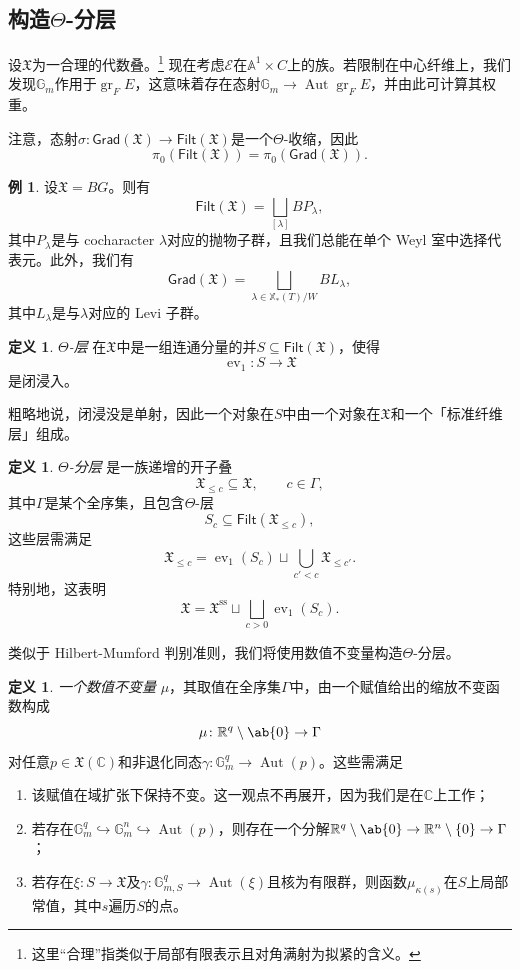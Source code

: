 \documentclass{amsart}
\theoremstyle{definition}
\newtheorem{defn}[thm]{定义}
\newtheorem{exm}[thm]{例}
\theoremstyle{remark}
\theoremstyle{plain}
\theoremstyle{definition}
\theoremstyle{remark}
\newcommand{\A}{\mathbb{A}}
\newcommand{\G}{\mathbb{G}}
\newcommand{\R}{\mathbb{R}}
\newcommand{\C}{\mathbb{C}}
\newcommand{\mc}[1]{\mathcal{#1}}
\newcommand{\mf}[1]{\mathfrak{#1}}
\newcommand{\mr}[1]{\mathrm{#1}}
\newcommand{\on}[1]{\operatorname{#1}}
\newcommand{\ms}[1]{\mathsf{#1}}
\newcommand{\1}{\mathbf{1}}
\newcommand{\2}{\mathbf{2}}
\newcommand{\3}{\mathbf{3}}
\DeclareMathOperator{\Aut}{Aut}
\DeclareMathOperator{\ev}{ev}
\begin{document}
\subsection{构造\(\Theta\)-分层}%
\label{sub:Construction of Theta-stratifications}

设\(\mf{X}\)为一合理的代数叠。\footnote{ 这里“合理”指类似于局部有限表示且对角满射为拟紧的含义。} 现在考虑\(\mc{E}\)在\(\A^1 \times C\)上的族。若限制在中心纤维上，我们发现\(\G_m\)作用于\(\on{gr}_F E\)，这意味着存在态射\(\G_m \to \Aut \on{gr}_F E\)，并由此可计算其权重。

注意，态射\(\sigma \colon \ms{Grad}(\mf{X}) \to \ms{Filt}(\mf{X})\)是一个\(\Theta\)-收缩，因此
\[ \pi_0(\ms{Filt}(\mf{X})) = \pi_0(\ms{Grad}(\mf{X})). \]

\begin{exm}
设\(\mf{X} = BG\)。则有
    \[\ms{Filt}(\mf{X}) = \bigsqcup_{[\lambda]} B P_{\lambda}, \]
其中\(P_{\lambda}\)是与 cocharacter \(\lambda\)对应的抛物子群，且我们总能在单个 Weyl 室中选择代表元。此外，我们有
    \[ \ms{Grad}(\mf{X}) = \bigsqcup_{\lambda \in \mathbb{X}_*(T)/W} B L_{\lambda}, \]
其中\(L_{\lambda}\)是与\(\lambda\)对应的 Levi 子群。
\end{exm}

\begin{defn}
\textit{\(\Theta\)-层} 在\(\mf{X}\)中是一组连通分量的并\(S \subseteq \ms{Filt}(\mf{X})\)，使得
    \[ \ev_1 \colon S \to \mf{X} \]
是闭浸入。
\end{defn}

粗略地说，闭浸没是单射，因此一个对象在\(S\)中由一个对象在\(\mf{X}\)和一个「标准纤维层」组成。

\begin{defn}
\textit{\(\Theta\)-分层} 是一族递增的开子叠
    \[ \mf{X}_{\leq c} \subseteq \mf{X}, \qquad c \in \Gamma, \]
其中\(\Gamma\)是某个全序集，且包含\(\Theta\)-层
    \[ S_c \subseteq \ms{Filt}(\mf{X}_{\leq c}), \]
这些层需满足
    \[ \mf{X}_{\leq c} = \ev_1(S_c) \sqcup \bigcup_{c' < c} \mf{X}_{\leq c'}. \]
特别地，这表明
    \[ \mf{X} = \mf{X}^{\mr{ss}} \sqcup \bigsqcup_{c > 0} \ev_1(S_c). \]
\end{defn}

类似于 Hilbert-Mumford 判别准则，我们将使用数值不变量构造\(\Theta\)-分层。
\begin{defn}
\textit{一个数值不变量} \(\mu\)，其取值在全序集\(\Gamma\)中，由一个赋值给出的缩放不变函数构成
    \[ \mu \colon \R^q \setminus \ab\{0\} \to \Gamma \]
对任意\(p \in \mf{X}(\C)\)和非退化同态\(\gamma \colon \G_m^q \to \Aut(p)\)。这些需满足
    \begin{enumerate}
\item 该赋值在域扩张下保持不变。这一观点不再展开，因为我们是在\(\C\)上工作；
\item 若存在\(\G_m^q \hookrightarrow \G_m^n \hookrightarrow \Aut(p)\)，则存在一个分解\(\R^q \setminus \ab\{0\} \to \R^n \setminus \{0\} \to \Gamma\)；
\item 若存在\(\xi \colon S \to \mf{X}\)及\(\gamma \colon \G_{m, S}^q \to \Aut(\xi)\)且核为有限群，则函数\(\mu_{\kappa(s)}\)在\(S\)上局部常值，其中\(s\)遍历\(S\)的点。
    \end{enumerate}
\end{defn}
\end{document}

